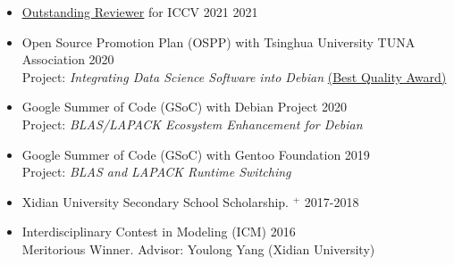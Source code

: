 \documentclass[10pt,margin,line,pifont,palatino,courier]{res}
\begin{document}
\begin{resume}
\begin{itemize}[leftmargin=*]
	\item \href{http://iccv2021.thecvf.com/outstanding-reviewers}{\underline{Outstanding Reviewer}} for ICCV 2021 \hfill 2021
	\item Open Source Promotion Plan (OSPP) with Tsinghua University TUNA Association \hfill 2020\\
		{\small Project: \textit{Integrating Data Science Software into Debian} \href{https://isrc.iscas.ac.cn/summer2020/#/announcement}{(Best Quality Award)}}
	\item Google Summer of Code (GSoC) with Debian Project \hfill 2020\\
		{\small Project: \textit{BLAS/LAPACK Ecosystem Enhancement for Debian}}
	\item Google Summer of Code (GSoC) with Gentoo Foundation \hfill 2019\\
		{\small Project: \textit{BLAS and LAPACK Runtime Switching}}
	\item Xidian University Secondary School Scholarship.%
		\href{http://see.xidian.edu.cn/html/news/9732.html}{$^+$} \hfill 2017-2018
	\item Interdisciplinary Contest in Modeling (ICM) \hfill 2016\\
		{\small Meritorious Winner. Advisor: Youlong Yang (Xidian University)}
\end{itemize}

\end{resume}
\end{document}

